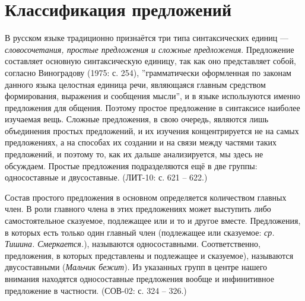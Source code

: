 \section{Классификация предложений}

В русском языке традиционно признаётся три типа синтаксических единиц --- \textit{словосочетания, простые предложения и сложные предложения}. Предложение составляет основную синтаксическую единицу, так как оно представляет собой, согласно Виноградову (1975: с. 254), ''грамматически оформленная по законам данного языка целостная единица речи, являющаяся главным средством формирования, выражения и сообщения мысли'', и в языке используются именно предложения для общения. Поэтому простое предложение в синтаксисе наиболее изучаемая вещь. Сложные предложения, в свою очередь, являются лишь объединения простых предложений, и их изучения концентрируется не на самых предложениях, а на способах их создании и на связи между частями таких предложений, и поэтому то, как их дальше анализируется, мы здесь не обсуждаем. Простые предложения подразделяются ещё в две группы: односоставные и двусоставные. (ЛИТ-10: с. 621 -- 622.) 

Состав простого предложения в основном определяется количеством главных член. В роли главного члена в этих предложениях может выступить либо самостоятельное сказуемое, подлежащее или и то и другое вместе. Предложения, в которых есть только один главный член (подлежащее или сказуемое: \textit{ср. Тишина. Смеркается.}), называются односоставными. Соответственно, предложения, в которых представлены и подлежащее и сказуемое), называются двусоставными (\textit{Мальчик бежит}). Из указанных групп в центре нашего внимания находятся односоставные предложения вообще и инфинитивное предложение в частности. (СОВ-02: с. 324 -- 326.)


